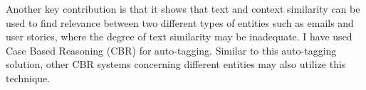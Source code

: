 Another key contribution is that it shows that text and context similarity can be used to find relevance between two different types of entities such as emails and user stories, where the degree of text similarity may be inadequate. I have used Case Based Reasoning (CBR) for auto-tagging. Similar to this auto-tagging solution, other CBR systems concerning different entities may also utilize this technique.
